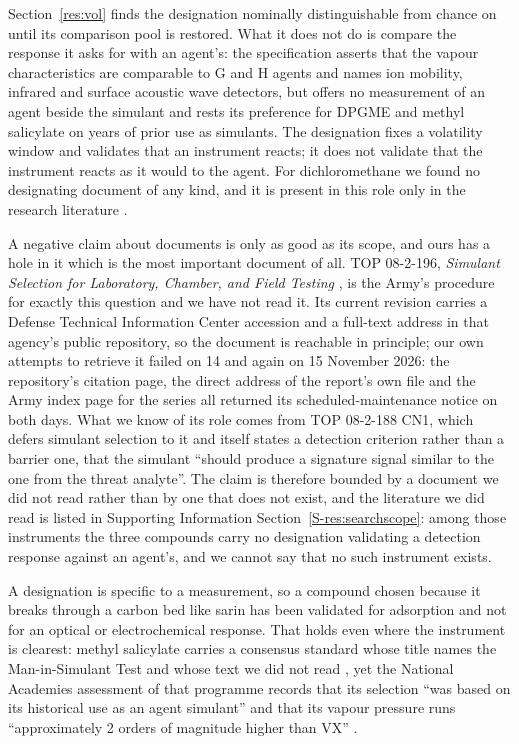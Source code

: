 \documentclass[journal=ancham,manuscript=article,margin=1in]{achemso}
\begin{document}
Section~\ref{res:vol} finds the designation nominally distinguishable from
chance on until its comparison pool is restored. What it does not do is compare the response it asks for with an
agent's: the specification asserts that the vapour characteristics are
comparable to G and H agents and names ion mobility, infrared and surface
acoustic wave detectors, but offers no measurement of an agent beside the
simulant and rests its preference for DPGME and methyl salicylate on years of
prior use as simulants. The designation fixes a volatility window and validates
that an instrument reacts; it does not validate that the instrument reacts as it
would to the agent. For dichloromethane we
found no designating document of any kind, and it is present in this role only
in the research literature \cite{lee2011sno2}.

A negative claim about documents is only as good as its scope, and ours has a
hole in it which is the most important document of all. TOP 08-2-196,
\emph{Simulant Selection for Laboratory, Chamber, and Field Testing}
\cite{top082196}, is the Army's procedure for exactly this question and we have
not read it. Its current revision carries a Defense Technical Information Center
accession and a full-text address in that agency's public repository, so the
document is reachable in principle; our own attempts to retrieve it
failed on 14 and again on 15 November 2026: the repository's citation page, the
direct address of the report's own file and the Army index page for the series
all returned its scheduled-maintenance notice on both days. What we know of its
role comes from TOP 08-2-188 CN1, which defers simulant selection to it
\cite{top082188} and itself states a detection criterion rather than a barrier
one, that the simulant ``should produce a signature signal similar to the one
from the threat analyte''. The claim is therefore bounded by a document we did
not read rather than by one that does not exist, and the literature we did read
is listed in Supporting Information Section~\ref{S-res:searchscope}: among those
instruments the three compounds carry no designation validating a detection
response against an agent's, and we cannot say that no such instrument exists.

A designation is specific to a measurement,
so a compound chosen because it breaks through a carbon bed like sarin has been
validated for adsorption and not for an optical or electrochemical response.
That holds even where the instrument is clearest: methyl salicylate carries a
consensus standard whose title names the Man-in-Simulant Test and whose text
we did not read \cite{astmf2588}, yet the National Academies assessment of that
programme records that its selection ``was based on its historical use as an
agent simulant'' and that its vapour pressure runs ``approximately 2 orders of
magnitude higher than VX'' \cite{nrc1997mist}.
\end{document}
